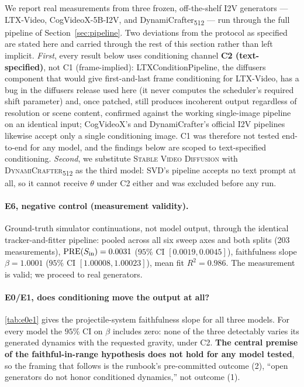 We report real measurements from three frozen, off-the-shelf I2V generators
--- LTX-Video, CogVideoX-5B-I2V, and DynamiCrafter\textsubscript{512} --- run
through the full pipeline of Section~\ref{sec:pipeline}. Two deviations from
the protocol as specified are stated here and carried through the rest of
this section rather than left implicit. \emph{First}, every result below uses
conditioning channel \textbf{C2 (text-specified)}, not C1 (frame-implied):
LTXConditionPipeline, the diffusers component that would give first-and-last
frame conditioning for LTX-Video, has a bug in the diffusers release used
here (it never computes the scheduler's required shift parameter) and, once
patched, still produces incoherent output regardless of resolution or scene
content, confirmed against the working single-image pipeline on an identical
input; CogVideoX's and DynamiCrafter's official I2V pipelines likewise accept
only a single conditioning image. C1 was therefore not tested end-to-end for
any model, and the findings below are scoped to text-specified conditioning.
\emph{Second}, we substitute \textsc{Stable Video Diffusion} with
\textsc{DynamiCrafter}\textsubscript{512} as the third model: SVD's pipeline
accepts no text prompt at all, so it cannot receive $\theta$ under C2 either
and was excluded before any run.

\paragraph{E6, negative control (measurement validity).}
Ground-truth simulator continuations, not model output, through the identical
tracker-and-fitter pipeline: pooled across all six sweep axes and both splits
(203 measurements), $\mathrm{PRE}(S_\text{in}) = 0.0031$ ($95\%$ CI $[0.0019,
0.0045]$), faithfulness slope $\beta = 1.0001$ ($95\%$ CI $[1.00008,
1.00023]$), mean fit $R^2 = 0.986$. The measurement is valid; we proceed to
real generators.

\paragraph{E0/E1, does conditioning move the output at all?}
\autoref{tab:e0e1} gives the projectile-system faithfulness slope for all
three models. For every model the $95\%$ CI on $\beta$ includes zero: none of
the three detectably varies its generated dynamics with the requested
gravity, under C2. \textbf{The central premise of the faithful-in-range
hypothesis does not hold for any model tested}, so the framing that follows is
the runbook's pre-committed outcome (2), ``open generators do not honor
conditioned dynamics,'' not outcome (1).

